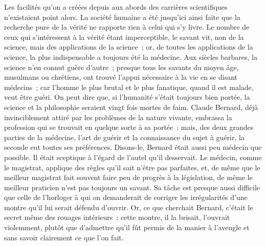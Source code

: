 \documentclass[french,twoside]{book} %
\newcommand\orgName[1]{#1}
\newcommand\persName[1]{#1}
\begin{document}
Les facilités qu’on a créées depuis aux abords des carrières scientifiques n’existaient point alors. La société humaine a été jusqu’ici ainsi faite que la recherche pure de la vérité ne rapporte rien à celui qui s’y livre. Le nombre de ceux qui s’intéressent à la vérité étant imperceptible, le savant vit, non de la science, mais des applications de la science ; or, de toutes les applications de la science, la plus indispensable a toujours été la médecine. Aux siècles barbares, la science n’en connut guère d’autre ; presque tous les savants du moyen âge, {\orgName musulmans} ou {\orgName chrétiens}, ont trouvé l’appui nécessaire à la vie en se disant médecins ; car l’homme le plus brutal et le plus fanatique, quand il est malade, veut être guéri. On peut dire que, si l’humanité s’était toujours bien portée, la science et la philosophie seraient vingt fois mortes de faim. {\persName Claude Bernard}, déjà invinciblement attiré par les problèmes de la nature vivante, embrassa la profession qui se trouvait en quelque sorte à sa portée ; mais, des deux grandes parties de la médecine, l’art de guérir et la connaissance du sujet à guérir, la seconde eut toutes ses préférences. Disons-le, {\persName Bernard} était aussi peu médecin que possible. Il était sceptique à l’égard de l’autel qu’il desservait. Le médecin, comme le magistrat, applique des règles qu’il sait n’être pas parfaites, et, de même que le meilleur magistrat fait souvent faire peu de progrès à la législation, de même le meilleur praticien n’est pas toujours un savant. Sa tâche est presque aussi difficile que celle de l’horloger à qui on demanderait de corriger les irrégularités d’une montre qu’il lui serait défendu d’ouvrir. Or, ce que cherchait {\persName Bernard}, c’était le secret même des rouages intérieurs ; cette montre, il la brisait, l’ouvrait violemment, plutôt que d’admettre qu’il fût permis de la manier à l’aveugle et sans savoir clairement ce que l’on fait.\par
\end{document}
